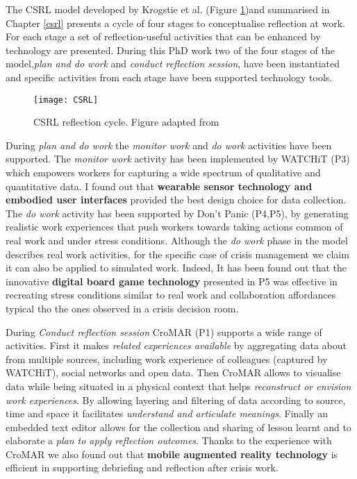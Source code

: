 The CSRL model developed by Krogstie et al. \autocite*{Krogstie:2013kf}
(Figure \ref{fig:csrl-model-contrib})and summarised in Chapter
\ref{csrl} presents a cycle of four stages to conceptualise reflection
at work. For each stage a set of reflection-useful activities that can
be enhanced by technology are presented. During this PhD work two of the
four stages of the model,\emph{plan and do work} and \emph{conduct
reflection session}, have been instantiated and specific activities from
each stage have been supported technology tools.

\begin{figure}[tbh]
    \centering
    \texttt{[image: CSRL]}
    \caption{CSRL reflection cycle. Figure adapted from \protect\cite{Krogstie:2013kf}}
    \label{fig:csrl-model-contrib}
\end{figure}

During \emph{plan and do work} the \emph{monitor work} and \emph{do
work} activities have been supported. The \emph{monitor work} activity
has been implemented by WATCHiT (P3) which empowers workers for
capturing a wide spectrum of qualitative and quantitative data. I found
out that \textbf{wearable sensor technology and embodied user
interfaces} provided the best design choice for data collection. The
\emph{do work} activity has been supported by Don't Panic (P4,P5), by
generating realistic work experiences that push workers towards taking
actions common of real work and under stress conditions. Although the
\emph{do work} phase in the model describes real work activities, for
the specific case of crisis management we claim it can also be applied
to simulated work. Indeed, It has been found out that the innovative
\textbf{digital board game technology} presented in P5 was effective in
recreating stress conditions similar to real work and collaboration
affordances typical tho the ones observed in a crisis decision room.

During \emph{Conduct reflection session} CroMAR (P1) supports a wide
range of activities. First it makes \emph{related experiences available}
by aggregating data about from multiple sources, including work
experience of colleagues (captured by WATCHiT), social networks and open
data. Then CroMAR allows to visualise data while being situated in a
physical context that helps \emph{reconstruct or envision work
experiences}. By allowing layering and filtering of data according to
source, time and space it facilitates \emph{understand and articulate
meanings}. Finally an embedded text editor allows for the collection and
sharing of lesson learnt and to elaborate a \emph{plan to apply
reflection outcomes}. Thanks to the experience with CroMAR we also found
out that \textbf{mobile augmented reality technology} is efficient in
supporting debriefing and reflection after crisis work.

